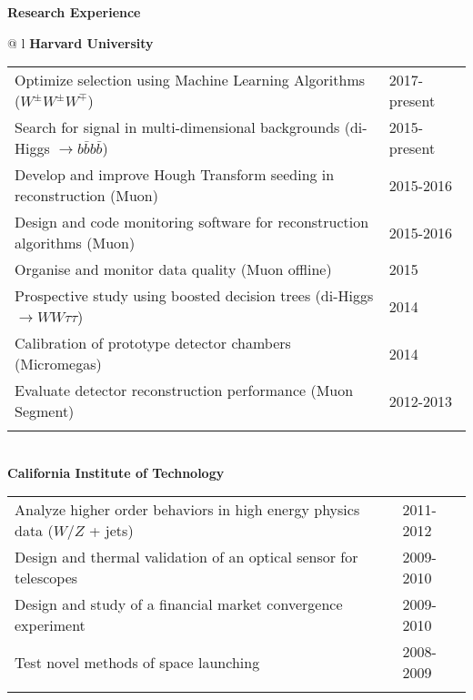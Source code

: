 \documentclass[letterpaper,11pt,oneside]{article}
\begin{document}
 \raggedright
 \textbf{\Large{Research Experience}} \\
 \normalsize
\begin{flushleft}
 \begin{tabular}{@{} l}
    \textbf{Harvard University} \\ 
    \begin{tabular}{@{} l l }
 Optimize selection using Machine Learning Algorithms ($W^{\pm} W^{\pm} W^{\mp}$) & 2017-present\\
 Search for signal in multi-dimensional backgrounds (di-Higgs $\to b\bar{b}b\bar{b}$) & 2015-present\\
 Develop and improve Hough Transform seeding in reconstruction (Muon) & 2015-2016\\
 Design and code monitoring software for reconstruction algorithms (Muon) & 2015-2016\\
 Organise and monitor data quality (Muon offline) & 2015\\
 Prospective study using boosted decision trees (di-Higgs $\to WW\tau\tau$) & 2014\\
 Calibration of prototype detector chambers (Micromegas) & 2014\\
 Evaluate detector reconstruction performance (Muon Segment) & 2012-2013\\
    \hspace{0.8\linewidth} & \hspace{0.1\linewidth} \\
     \end{tabular}
     \\
     \textbf{California Institute of Technology} \\
     \begin{tabular}{@{} l l }
 Analyze higher order behaviors in high energy physics data ($W/Z$ + jets) &2011-2012\\
 Design and thermal validation of an optical sensor for telescopes &2009-2010\\
 Design and study of a financial market convergence experiment &2009-2010\\
 Test novel methods of space launching &2008-2009\\
    \hspace{0.8\linewidth} & \hspace{0.1\linewidth} \\
      \end{tabular}
      \end{tabular}
\end{flushleft}
\end{document}
